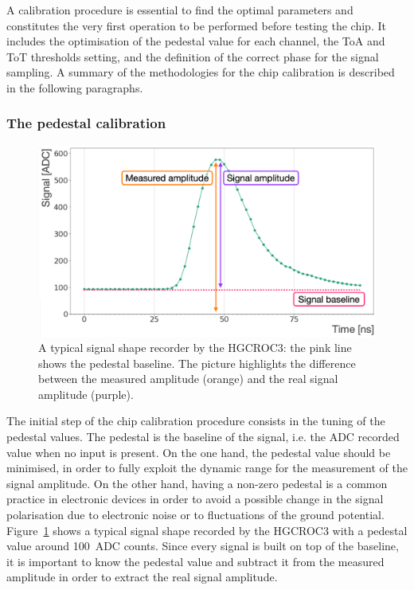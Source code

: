 A calibration procedure is essential to find the optimal parameters and constitutes the very first operation to be performed before testing the chip. It includes the optimisation of the pedestal value for each channel, the ToA and ToT thresholds setting, and the definition of the correct phase for the signal sampling. A summary of the methodologies for the chip calibration is described in the following paragraphs.

\subsubsection{The pedestal calibration}
\label{subsubsec:The pedestal calibration}

\begin{figure}
    \centering
    \includegraphics[width=0.6\linewidth]{Figures/HGCAL/SignalBaseline.pdf}
    \caption{A typical signal shape recorder by the HGCROC3: the pink line shows the pedestal baseline. The picture highlights the difference between the measured amplitude (orange) and the real signal amplitude (purple).}
    \label{fig:SignalBaseline}
\end{figure}

The initial step of the chip calibration procedure consists in the tuning of the pedestal values. The pedestal is the baseline of the signal, i.e. the ADC recorded value when no input is present. On the one hand, the pedestal value should be minimised, in order to fully exploit the dynamic range for the measurement of the signal amplitude. On the other hand, having a non-zero pedestal is a common practice in electronic devices in order to avoid a possible change in the signal polarisation due to electronic noise or to fluctuations of the ground potential.
Figure~\ref{fig:SignalBaseline} shows a typical signal shape recorded by the HGCROC3 with a pedestal value around 100~ADC counts. Since every signal is built on top of the baseline, it is important to know the pedestal value and subtract it from the measured amplitude in order to extract the real signal amplitude.

